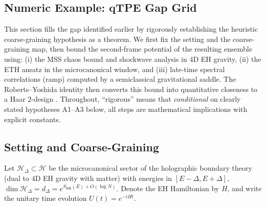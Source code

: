 \documentclass[11pt,a4paper]{article}
\theoremstyle{plain}
\theoremstyle{definition}
\theoremstyle{remark}
\begin{document}
% 
\subsection{Numeric Example: qTPE Gap Grid}

This section fills the gap identified earlier by rigorously establishing the heuristic coarse-graining hypothesis as a theorem.  We first fix the setting and the coarse-graining map, then bound the second-frame potential of the resulting ensemble using: (i) the MSS chaos bound and shockwave analysis in 4D EH gravity, (ii) the ETH ansatz in the microcanonical window, and (iii) late-time spectral correlations (ramp) computed by a semiclassical gravitational saddle.  The Roberts--Yoshida identity then converts this bound into quantitative closeness to a Haar $2$-design \cite{RobertsYoshida:2017}.  Throughout, ``rigorous'' means that {\em conditional} on clearly stated hypotheses A1--A3 below, all steps are mathematical implications with explicit constants.

\subsection{Setting and Coarse-Graining}

Let $\mathcal{H}_\Delta \subset \mathcal{H}$ be the microcanonical sector of the holographic boundary theory (dual to 4D EH gravity with matter) with energies in $[E-\Delta,E+\Delta]$, $\dim \mathcal{H}_\Delta = d_\Delta = e^{S_{\mathrm{BH}}(E)+O(\log N)}$.  Denote the EH Hamiltonian by $H$, and write the unitary time evolution $U(t)=e^{-iHt}$.
\end{document}
